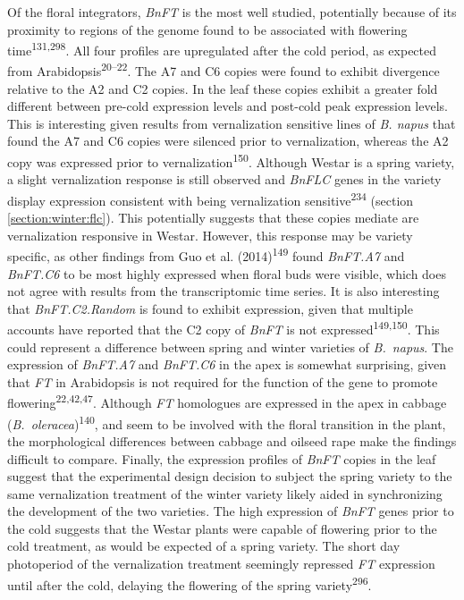 \documentclass[12pt,]{book}
\begin{document}
Of the floral integrators, \emph{BnFT} is the most well studied,
potentially because of its proximity to regions of the genome found to
be associated with flowering time\textsuperscript{131,298}. All four
profiles are upregulated after the cold period, as expected from
Arabidopsis\textsuperscript{20--22}. The A7 and C6 copies were found to
exhibit divergence relative to the A2 and C2 copies. In the leaf these
copies exhibit a greater fold different between pre-cold expression
levels and post-cold peak expression levels. This is interesting given
results from vernalization sensitive lines of \emph{B. napus} that found
the A7 and C6 copies were silenced prior to vernalization, whereas the
A2 copy was expressed prior to vernalization\textsuperscript{150}.
Although Westar is a spring variety, a slight vernalization response is
still observed and \emph{BnFLC} genes in the variety display expression
consistent with being vernalization sensitive\textsuperscript{234}
(section \ref{section:winter:flc}). This potentially suggests that these
copies mediate are vernalization responsive in Westar. However, this
response may be variety specific, as other findings from Guo et al.
(2014)\textsuperscript{149} found \emph{BnFT.A7} and \emph{BnFT.C6} to
be most highly expressed when floral buds were visible, which does not
agree with results from the transcriptomic time series. It is also
interesting that \emph{BnFT.C2.Random} is found to exhibit expression,
given that multiple accounts have reported that the C2 copy of
\emph{BnFT} is not expressed\textsuperscript{149,150}. This could
represent a difference between spring and winter varieties of
\emph{B.~napus}. The expression of \emph{BnFT.A7} and \emph{BnFT.C6} in
the apex is somewhat surprising, given that \emph{FT} in Arabidopsis is
not required for the function of the gene to promote
flowering\textsuperscript{22,42,47}. Although \emph{FT} homologues are
expressed in the apex in cabbage
(\emph{B.~oleracea})\textsuperscript{140}, and seem to be involved with
the floral transition in the plant, the morphological differences
between cabbage and oilseed rape make the findings difficult to compare.
Finally, the expression profiles of \emph{BnFT} copies in the leaf
suggest that the experimental design decision to subject the spring
variety to the same vernalization treatment of the winter variety likely
aided in synchronizing the development of the two varieties. The high
expression of \emph{BnFT} genes prior to the cold suggests that the
Westar plants were capable of flowering prior to the cold treatment, as
would be expected of a spring variety. The short day photoperiod of the
vernalization treatment seemingly repressed \emph{FT} expression until
after the cold, delaying the flowering of the spring
variety\textsuperscript{296}.
\end{document}
